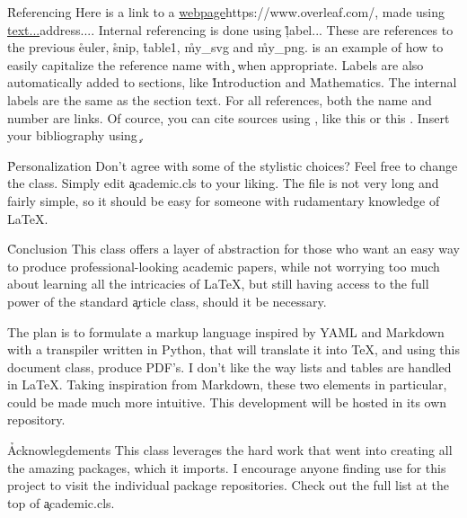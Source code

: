 \documentclass[article,twocolumn]{lix}
\begin{document}

\h{Referencing}
Here is a link to a \url{webpage}{https://www.overleaf.com/}, made using \c{\url{text...}{address...}}. Internal referencing is done using \c{\r{label...}} These are references to the previous \r{euler}, \r{snip}, \r{table1}, \r{my_svg} and \r{my_png}.  is an example of how to easily capitalize the reference name with \c{} when appropriate. Labels are also automatically added to sections, like \r{Introduction} and \r{Mathematics}. The internal labels are the same as the section text. For all references, both the name and number are links. Of cource, you can cite sources using \c{\cite{...}}, like this \cite{minted} or this \cite{tabularray}. Insert your bibliography using \c{}.

\h*{Personalization}
Don't agree with some of the stylistic choices? Feel free to change the class. Simply edit \c{academic.cls} to your liking. The file is not very long and fairly simple, so it should be easy for someone with rudamentary knowledge of LaTeX.

\h*{Conclusion}
This class offers a layer of abstraction for those who want an easy way to produce professional-looking academic papers, while not worrying too much about learning all the intricacies of LaTeX, but still having access to the full power of the standard \c{article} class, should it be necessary.

The plan is to formulate a markup language inspired by YAML and Markdown with a transpiler written in Python, that will translate it into TeX, and using this document class, produce PDF's. I don't like the way lists and tables are handled in LaTeX. Taking inspiration from Markdown, these two elements in particular, could be made much more intuitive. This development will be hosted in its own repository.

\h*{Acknowlegdements}
This class leverages the hard work that went into creating all the amazing packages, which it imports. I encourage anyone finding use for this project to visit the individual package repositories. Check out the full list at the top of \c{academic.cls}.
\end{document}
